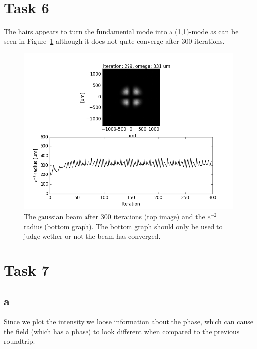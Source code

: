 \documentclass[12pt,a4paper]{article}
\begin{document}
\section{Task 6}\label{sec:6}
The hairs appears to turn the fundamental mode into a (1,1)-mode as can be seen in Figure~\ref{fig:task6} although it does not quite converge after 300 iterations.
\begin{figure}
  \centering
  \includegraphics[width=\textwidth]{6_gauss_1_1.png}
  \caption{The gaussian beam after 300 iterations (top image) and the $e^{-2}$ radius (bottom graph). The bottom graph should only be used to judge wether or not the beam has converged.}
  \label{fig:task6}
\end{figure}

\section{Task 7}\label{sec:7}
\subsection{a}
Since we plot the intensity we loose information about the phase, which can cause the field (which has a phase) to look different when compared to the previous roundtrip.
\end{document}
